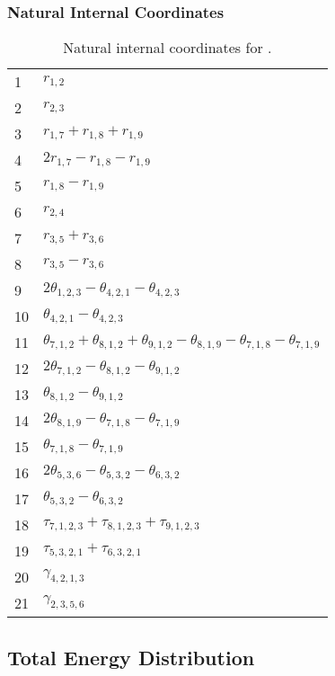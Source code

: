 \documentclass[10pt,oneside]{article}
\begin{document}
\begin{table}[h!]
\subsubsection*{Natural Internal Coordinates}
\centering
\caption{Natural internal coordinates for .}
\small
\begin{tabular}{ll}
\toprule
  1   & $r_{1,2}$ \\
  2   & $r_{2,3}$ \\
  3   & $r_{1,7} + r_{1,8} + r_{1,9}$ \\
  4   & $2r_{1,7} - r_{1,8} - r_{1,9}$ \\
  5   & $r_{1,8} - r_{1,9}$ \\
  6   & $r_{2,4}$ \\
  7   & $r_{3,5} + r_{3,6}$ \\
  8   & $r_{3,5} - r_{3,6}$ \\
  9   & $2\theta_{1,2,3} - \theta_{4,2,1} - \theta_{4,2,3}$ \\
  10  & $\theta_{4,2,1} - \theta_{4,2,3}$ \\
  11  & $\theta_{7,1,2} + \theta_{8,1,2} + \theta_{9,1,2} - \theta_{8,1,9} - \theta_{7,1,8} - \theta_{7,1,9}$ \\
  12  & $2\theta_{7,1,2} - \theta_{8,1,2} - \theta_{9,1,2}$ \\
  13  & $\theta_{8,1,2} - \theta_{9,1,2}$ \\
  14  & $2\theta_{8,1,9} - \theta_{7,1,8} - \theta_{7,1,9}$ \\
  15  & $\theta_{7,1,8} - \theta_{7,1,9}$ \\
  16  & $2\theta_{5,3,6} - \theta_{5,3,2} - \theta_{6,3,2}$ \\
  17  & $\theta_{5,3,2} - \theta_{6,3,2}$ \\
  18  & $\tau_{7,1,2,3} + \tau_{8,1,2,3} + \tau_{9,1,2,3}$ \\
  19  & $\tau_{5,3,2,1} + \tau_{6,3,2,1}$ \\
  20  & $\gamma_{4,2,1,3}$ \\
  21  & $\gamma_{2,3,5,6}$ \\
\bottomrule
\end{tabular}
\end{table}

\begin{table}
\subsection*{Total Energy Distribution}
\centering\end{table}
\end{document}

